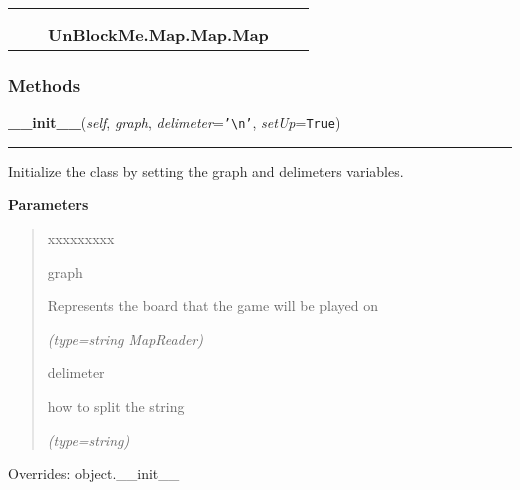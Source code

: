     \label{UnBlockMe:Map:Map:Map}
\begin{tabular}{cccccc}
\multicolumn{2}{r}{\settowidth{\BCL}{object}\multirow{2}{\BCL}{object}}
&&
  \\\cline{3-3}
  &&\multicolumn{1}{c|}{}
&&
  \\
&&\multicolumn{2}{l}{\textbf{UnBlockMe.Map.Map.Map}}
\end{tabular}



  \subsubsection{Methods}

    \vspace{0.5ex}

\hspace{.8\funcindent}\begin{boxedminipage}{\funcwidth}

    \raggedright \textbf{\_\_init\_\_}(\textit{self}, \textit{graph}, \textit{delimeter}={\tt \texttt{'}\texttt{{\textbackslash}n}\texttt{'}}, \textit{setUp}={\tt True})

    \vspace{-1.5ex}

    \rule{\textwidth}{0.5\fboxrule}
\setlength{\parskip}{2ex}
    Initialize the class by setting the graph and delimeters variables.

\setlength{\parskip}{1ex}
      \textbf{Parameters}
      \vspace{-1ex}

      \begin{quote}
        \begin{Ventry}{xxxxxxxxx}

          \item[graph]

          Represents the board that the game will be played on

            {\it (type=string {\textbar} MapReader)}

          \item[delimeter]

          how to split the string

            {\it (type=string)}

        \end{Ventry}

      \end{quote}

      Overrides: object.\_\_init\_\_

    \end{boxedminipage}

